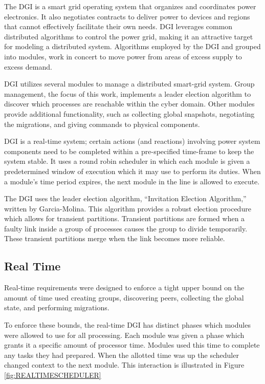 The DGI is a smart grid operating system that organizes and coordinates power electronics.
It also negotiates contracts to deliver power to devices and regions that cannot effectively facilitate their own needs.
DGI leverages common distributed algorithms to control the power grid, making it an attractive target for modeling a distributed system.
Algorithms employed by the \ac{DGI} and grouped into modules, work in concert to move power from areas of excess supply to excess demand.

DGI utilizes several modules to manage a distributed smart-grid system.
Group management, the focus of this work, implements a leader election algorithm to discover which processes are reachable within the cyber domain.
Other modules provide additional functionality, such as collecting global snapshots, negotiating the migrations, and giving commands to physical components.

DGI is a real-time system; certain actions (and reactions) involving power system components need to be completed within a pre-specified time-frame to keep the system stable.
It uses a round robin scheduler in which each module is given a predetermined window of execution which it may use to perform its duties.
When a module's time period expires, the next module in the line is allowed to execute. 

The DGI uses the leader election algorithm, ``Invitation Election Algorithm,'' written by Garcia-Molina\cite{INVITATIONELECTION}.
This algorithm provides a robust election procedure which allows for transient partitions.
Transient partitions are formed when a faulty link inside a group of processes causes the group to divide temporarily.
These transient partitions merge when the link becomes more reliable.

\subsection{Real Time}
Real-time requirements were designed to enforce a tight upper bound on the amount of time used creating groups, discovering peers, collecting the global state, and performing migrations.

To enforce these bounds, the real-time DGI has distinct phases which modules were allowed to use for all processing.
Each module was given a phase which grants it a specific amount of processor time.
Modules used this time to complete any tasks they had prepared.
When the allotted time was up the scheduler changed context to the next module.
This interaction is illustrated in Figure \ref{fig:REALTIMESCHEDULER}

